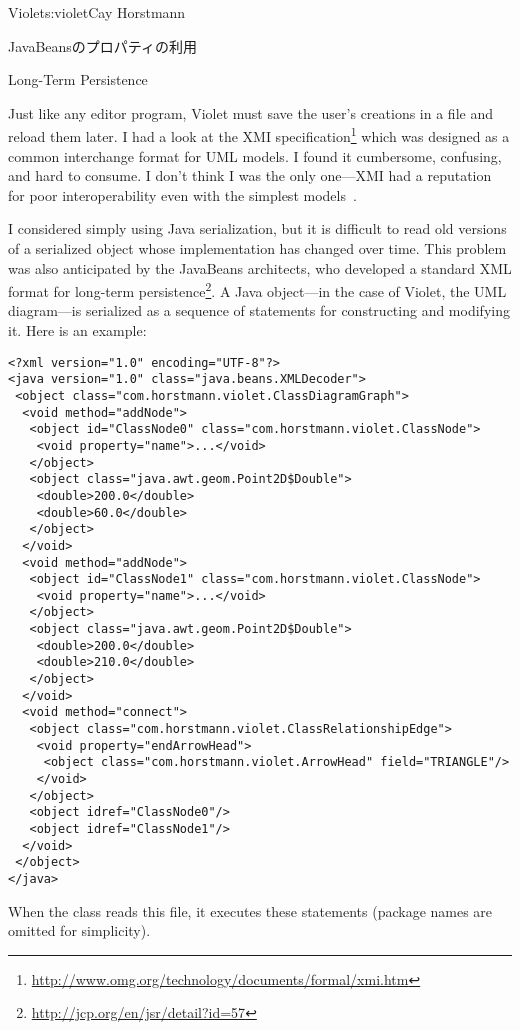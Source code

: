 \begin{aosachapter}{Violet}{s:violet}{Cay Horstmann}
\begin{aosasect1}{JavaBeansのプロパティの利用}
\end{aosasect1}

\begin{aosasect1}{Long-Term Persistence}

Just like any editor program, Violet must save the user's creations in
a file and reload them later. I had a look at the XMI
specification\footnote{\url{http://www.omg.org/technology/documents/formal/xmi.htm}}
which was designed as a common interchange format for UML models. I
found it cumbersome, confusing, and hard to consume. I don't think I
was the only one---XMI had a reputation for poor interoperability even
with the simplest models~\cite{bib:persson:osstools}.

I considered simply using Java serialization, but it is difficult to
read old versions of a serialized object whose implementation has
changed over time.  This problem was also anticipated by the JavaBeans
architects, who developed a standard XML format for long-term
persistence\footnote{\url{http://jcp.org/en/jsr/detail?id=57}}.  A
Java object---in the case of Violet, the UML diagram---is serialized
as a sequence of statements for constructing and modifying it. Here is
an example:

\begin{verbatim}
<?xml version="1.0" encoding="UTF-8"?>
<java version="1.0" class="java.beans.XMLDecoder">
 <object class="com.horstmann.violet.ClassDiagramGraph"> 
  <void method="addNode"> 
   <object id="ClassNode0" class="com.horstmann.violet.ClassNode"> 
    <void property="name">...</void> 
   </object> 
   <object class="java.awt.geom.Point2D$Double"> 
    <double>200.0</double> 
    <double>60.0</double> 
   </object> 
  </void> 
  <void method="addNode"> 
   <object id="ClassNode1" class="com.horstmann.violet.ClassNode"> 
    <void property="name">...</void> 
   </object> 
   <object class="java.awt.geom.Point2D$Double"> 
    <double>200.0</double> 
    <double>210.0</double> 
   </object> 
  </void> 
  <void method="connect"> 
   <object class="com.horstmann.violet.ClassRelationshipEdge"> 
    <void property="endArrowHead"> 
     <object class="com.horstmann.violet.ArrowHead" field="TRIANGLE"/> 
    </void> 
   </object> 
   <object idref="ClassNode0"/> 
   <object idref="ClassNode1"/> 
  </void> 
 </object> 
</java>
\end{verbatim}

When the  class reads this file, it executes these
statements (package names are omitted for simplicity).


\end{aosasect1}
\end{aosachapter}
